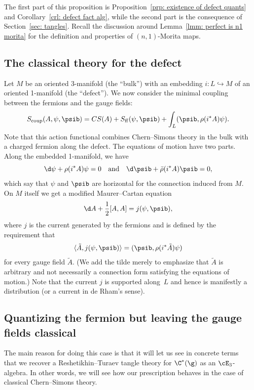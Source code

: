 \documentclass[10pt]{amsart}
\begin{document}
The first part of this proposition is Proposition~\ref{prp: existence of defect quants} and Corollary~\ref{crl: defect fact alg}, 
while the second part is the consequence of Section~\ref{sec: tangles}.
Recall the discussion around Lemma~\ref{lmm: perfect is n1 morita} for the definition and properties of $(n,1)$-Morita maps.

\subsection{The classical theory for the defect}

Let $M$ be an oriented 3-manifold (the ``bulk'') with an embedding $i: L \hookrightarrow M$ of an oriented 1-manifold (the ``defect'').
We now consider the minimal coupling between the fermions and the gauge fields:
\begin{equation}
\label{coupled action}
S_{\rm coup}(A,\psi,\psib) = CS(A) + S_{\rm ff}(\psi,\psib) + \int_L ( \psib, \rho(i^*A) \psi ).
\end{equation}
Note that this action functional combines Chern--Simons theory in the bulk 
with a charged fermion along the defect.
The equations of motion have two parts.
Along the embedded 1-manifold, we have
\[
\d \psi + \rho(i^*A) \psi = 0 \quad\text{and}\quad \d \psib + \bar{\rho}(i^*A) \psib = 0,
\]
which say that $\psi$ and $\psib$ are horizontal for the connection induced from $M$.
On $M$ itself we get a modified Maurer--Cartan equation
\[
\d A + \frac{1}{2}[A,A] = j(\psi,\psib),
\]
where $j$ is the current generated by the fermions and is defined by the requirement that
\[
\langle \tilde{A},j(\psi,\psib) \rangle = (\psib, \rho(i^*\tilde{A}) \psi)
\]
for every gauge field $\tilde{A}$. (We add the tilde merely to emphasize that $\tilde{A}$ is arbitrary and not necessarily a connection form satisfying the equations of motion.)
Note that the current $j$ is supported along~$L$ and hence is manifestly a distribution (or a current in de Rham's sense).

\subsection{Quantizing the fermion but leaving the gauge fields classical}

The main reason for doing this case is that it will let us see in concrete terms
that we recover a Reshetikhin--Turaev tangle theory for $\C^*(\g)$ as an $\cE_3$-algebra.
In other words, we will see how our prescription behaves in the case of classical Chern--Simons theory.
\end{document}
